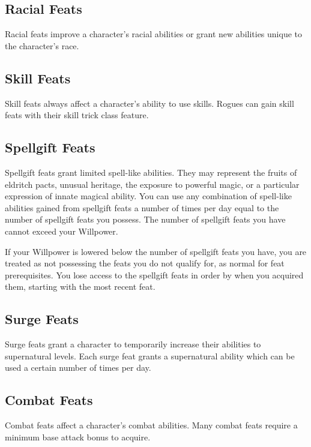 \subsection{Racial Feats}\label{Racial Feats}
Racial feats improve a character's racial abilities or grant new abilities unique to the character's race.

\subsection{Skill Feats}
Skill feats always affect a character's ability to use skills.
Rogues can gain skill feats with their skill trick class feature.

\subsection{Spellgift Feats}
Spellgift feats grant limited spell-like abilities.
They may represent the fruits of eldritch pacts, unusual heritage, the exposure to powerful magic, or a particular expression of innate magical ability.
You can use any combination of spell-like abilities gained from spellgift feats a number of times per day equal to the number of spellgift feats you possess.
The number of spellgift feats you have cannot exceed your Willpower.

If your Willpower is lowered below the number of spellgift feats you have, you are treated as not possessing the feats you do not qualify for, as normal for feat prerequisites.
You lose access to the spellgift feats in order by when you acquired them, starting with the most recent feat.

\subsection{Surge Feats}
Surge feats grant a character to temporarily increase their abilities to supernatural levels.
Each surge feat grants a supernatural ability which can be used a certain number of times per day.

\subsection{Combat Feats}
Combat feats affect a character's combat abilities.
Many combat feats require a minimum base attack bonus to acquire.


